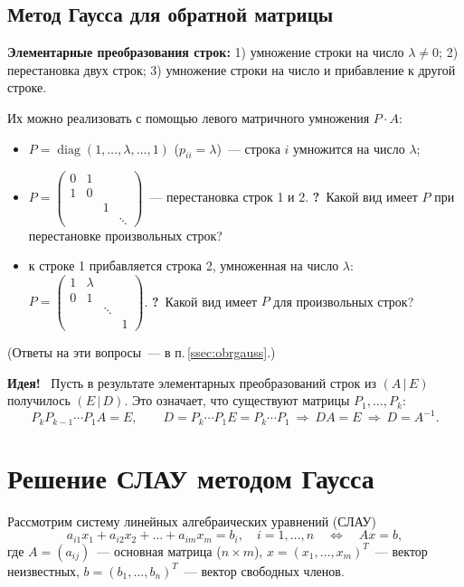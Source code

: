 \documentclass[a4paper,11pt]{article}
\newcommand{\lead}[1]{\textbf{\color{leadcol}#1}\ }
\newcommand{\q}{\textbf{\color{red!70!black}?}\ }
\newcommand{\diag}{\operatorname{diag}}
\begin{document}
\subsection{Метод Гаусса для обратной матрицы}
\textbf{Элементарные преобразования строк:} 1) умножение строки на число $\lambda\ne0$;
2) перестановка двух строк; 3) умножение строки на число и прибавление к другой строке.

Их можно реализовать с помощью левого матричного умножения $P\cdot A$:
\begin{itemize}
\item $P=\diag(1,\dots,\lambda,\dots,1)$ ($p_{ii}=\lambda$)~--- строка $i$ умножится на число $\lambda$;
\item $P=\begin{pmatrix}0&1&&\\1&0&&\\&&1&\\&&&\ddots\end{pmatrix}$~--- перестановка строк 1 и 2.
\q Какой вид имеет $P$ при перестановке произвольных строк?
\item к строке 1 прибавляется строка 2, умноженная на число $\lambda$: \
$P=\begin{pmatrix}1&\lambda&&\\0&1&&\\&&\ddots&\\&&&1\end{pmatrix}$.
\q Какой вид имеет $P$ для произвольных строк?
\end{itemize}
(Ответы на эти вопросы~--- в п.\,\ref{ssec:obrgauss}.)

\lead{Идея!} Пусть в результате элементарных преобразований строк из $(A\,|\,E)$ получилось $(E\,|\,D)$.
Это означает, что существуют матрицы $P_1,\dots,P_k$:
\[
P_kP_{k-1}\cdots P_1A=E,\qquad D=P_k\cdots P_1E=P_k\cdots P_1\ \Rightarrow\ DA=E\ \Rightarrow\ D=A^{-1}.
\]

\section{Решение СЛАУ методом Гаусса}
Рассмотрим систему линейных алгебраических уравнений (СЛАУ)
\[
a_{i1}x_1+a_{i2}x_2+\dots+a_{im}x_m=b_i,\quad i=1,\dots,n
\quad\iff\quad Ax=b,\tag{1}
\]
где $A=(a_{ij})$~--- основная матрица ($n\times m$), $x=(x_1,\dots,x_m)^T$~--- вектор неизвестных,
$b=(b_1,\dots,b_n)^T$~--- вектор свободных членов.
\end{document}
